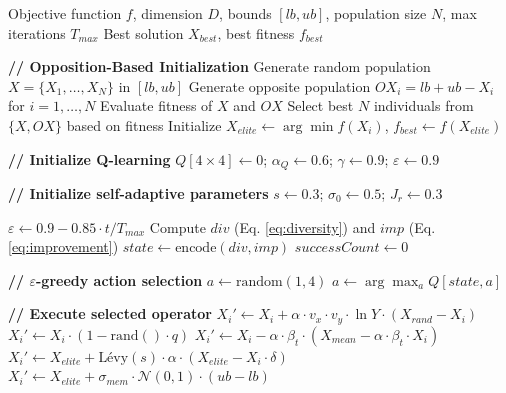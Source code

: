 \documentclass[preprint,12pt]{elsarticle}
\begin{document}
\begin{algorithm}[htbp]
\caption{QESDO: Q-learning Enhanced Self-adaptive Dandelion Optimizer}
\label{alg:qesdo}
\begin{algorithmic}[1]
\REQUIRE Objective function $f$, dimension $D$, bounds $[lb, ub]$, population size $N$, max iterations $T_{max}$
\ENSURE Best solution $X_{best}$, best fitness $f_{best}$

\STATE \textbf{// Opposition-Based Initialization}
\STATE Generate random population $X = \{X_1, \ldots, X_N\}$ in $[lb, ub]$
\STATE Generate opposite population $OX_i = lb + ub - X_i$ for $i = 1, \ldots, N$
\STATE Evaluate fitness of $X$ and $OX$
\STATE Select best $N$ individuals from $\{X, OX\}$ based on fitness
\STATE Initialize $X_{elite} \leftarrow \arg\min f(X_i)$, $f_{best} \leftarrow f(X_{elite})$

\STATE \textbf{// Initialize Q-learning}
\STATE $Q[4 \times 4] \leftarrow 0$; $\alpha_Q \leftarrow 0.6$; $\gamma \leftarrow 0.9$; $\varepsilon \leftarrow 0.9$

\STATE \textbf{// Initialize self-adaptive parameters}
\STATE $s \leftarrow 0.3$; $\sigma_0 \leftarrow 0.5$; $J_r \leftarrow 0.3$

    \STATE $\varepsilon \leftarrow 0.9 - 0.85 \cdot t / T_{max}$ 
    \STATE Compute $div$ (Eq. \ref{eq:diversity}) and $imp$ (Eq. \ref{eq:improvement})
    \STATE $state \leftarrow \text{encode}(div, imp)$ 
    \STATE $successCount \leftarrow 0$
    
        \STATE \textbf{// $\varepsilon$-greedy action selection}
            \STATE $a \leftarrow \text{random}(1, 4)$
        \ELSE
            \STATE $a \leftarrow \arg\max_a Q[state, a]$
        \ENDIF
        
        \STATE \textbf{// Execute selected operator}
         
                \STATE $X_i' \leftarrow X_i + \alpha \cdot v_x \cdot v_y \cdot \ln Y \cdot (X_{rand} - X_i)$
            \ELSE
                \STATE $X_i' \leftarrow X_i \cdot (1 - \text{rand}() \cdot q)$
            \ENDIF
         
            \STATE $X_i' \leftarrow X_i - \alpha \cdot \beta_t \cdot (X_{mean} - \alpha \cdot \beta_t \cdot X_i)$
         
            \STATE $X_i' \leftarrow X_{elite} + \text{Lévy}(s) \cdot \alpha \cdot (X_{elite} - X_i \cdot \delta)$
         
            \STATE $X_i' \leftarrow X_{elite} + \sigma_{mem} \cdot \mathcal{N}(0,1) \cdot (ub - lb)$
        \ENDIF
        

\end{algorithmic}
\end{algorithm}
\end{document}
